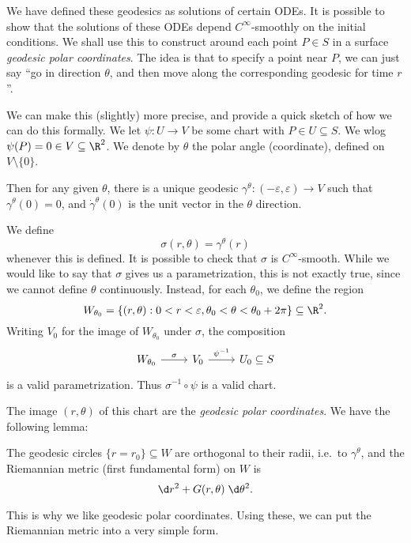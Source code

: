 \documentclass[a4paper]{article}
\begin{document}
We have defined these geodesics as solutions of certain ODEs. It is possible to show that the solutions of these ODEs depend $C^\infty$-smoothly on the initial conditions. We shall use this to construct around each point $P \in S$ in a surface \emph{geodesic polar coordinates}. The idea is that to specify a point near $P$, we can just say ``go in direction $\theta$, and then move along the corresponding geodesic for time $r$''.

We can make this (slightly) more precise, and provide a quick sketch of how we can do this formally. We let $\psi: U \to V$ be some chart with $P \in U \subseteq S$. We wlog $\psi(P) = 0 \in V \subseteq \R^2$. We denote by $\theta$ the polar angle (coordinate), defined on $V \setminus \{0\}$.
\begin{center}
\end{center}
Then for any given $\theta$, there is a unique geodesic $\gamma^{\theta}: (-\varepsilon, \varepsilon) \to V$ such that $\gamma^{\theta}(0) = 0$, and $\dot{\gamma}^\theta(0)$ is the unit vector in the $\theta$ direction.

We define
\[
  \sigma(r, \theta) = \gamma^\theta(r)
\]
whenever this is defined. It is possible to check that $\sigma$ is $C^\infty$-smooth. While we would like to say that $\sigma$ gives us a parametrization, this is not exactly true, since we cannot define $\theta$ continuously. Instead, for each $\theta_0$, we define the region
\[
  W_{\theta_0} = \{(r, \theta): 0 < r < \varepsilon, \theta_0 < \theta < \theta_0 + 2\pi\} \subseteq \R^2.
\]
Writing $V_0$ for the image of $W_{\theta_0}$ under $\sigma$, the composition
\[
  \begin{tikzcd}
    W_{\theta_0} \ar[r, "\sigma"] & V_0 \ar[r, "\psi^{-1}"] & U_0 \subseteq S
  \end{tikzcd}
\]
is a valid parametrization. Thus $\sigma^{-1} \circ \psi$ is a valid chart.

The image $(r, \theta)$ of this chart are the \emph{geodesic polar coordinates}. We have the following lemma:

\begin{lemma}
  The geodesic circles $\{r = r_0\} \subseteq W$ are orthogonal to their radii, i.e.\ to $\gamma^\theta$, and the Riemannian metric (first fundamental form) on $W$ is
  \[
    \d r^2 + G(r, \theta) \;\d \theta^2.
  \]
\end{lemma}
This is why we like geodesic polar coordinates. Using these, we can put the Riemannian metric into a very simple form.
\end{document}
